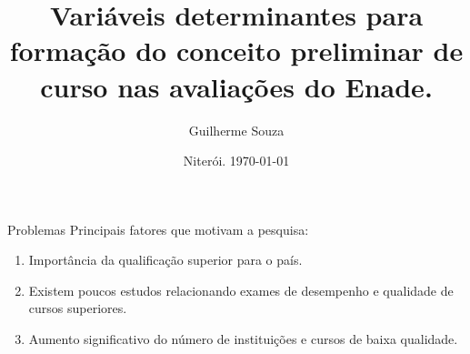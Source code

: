 \documentclass{beamer}
\title[Variáveis Determinantes - CPC e Enade]{Variáveis determinantes para formação do conceito preliminar de curso nas avaliações do Enade.}
\author[Guilherme]{Guilherme Souza}
\institute{Universidade Federal Fluminense}
\date{Niterói. \today}
\begin{document}
\begin{frame}
\titlepage
\end{frame}

\begin{frame}{Problemas}
	Principais fatores que motivam a pesquisa:
	\begin{enumerate}
	\item Importância da qualificação superior para o país.
	\item Existem poucos estudos relacionando exames de desempenho e qualidade de cursos superiores.
	\item Aumento significativo do número de instituições e cursos de baixa qualidade.

\end{enumerate}
\end{frame}
\end{document}
